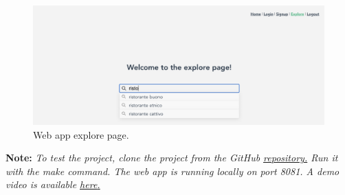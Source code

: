 \vspace{0.5in}

\begin{figure}[H]
    \begin{center}
        \includegraphics[width=15cm]{./images/explore_page.png}
    \end{center}
    \caption{Web app explore page.}
    \label{fig:explore_page}
\end{figure}

%

\textbf{Note: }\textit{ To test the project, clone the project from the GitHub \underline{\href{https://github.com/AlessioLuciani/RESTaurant-reservation}{repository}.} Run it with the make command. The web app is running locally on port 8081. A demo video is available \underline{\href{https://www.youtube.com/watch?v=2iVW3yifJOw}{here}.}} \clearpage
